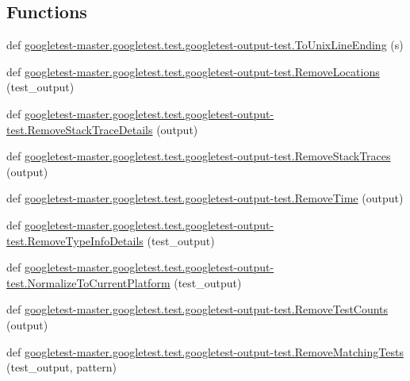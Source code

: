 \subsection*{Functions}
\begin{DoxyCompactItemize}
\item 
def \mbox{\hyperlink{namespacegoogletest-master_1_1googletest_1_1test_1_1googletest-output-test_a99ee2f28903ba3d04da61284954555ba}{googletest-\/master.\+googletest.\+test.\+googletest-\/output-\/test.\+To\+Unix\+Line\+Ending}} (s)
\item 
def \mbox{\hyperlink{namespacegoogletest-master_1_1googletest_1_1test_1_1googletest-output-test_ae2093a22c4f977ed13069650e4534fff}{googletest-\/master.\+googletest.\+test.\+googletest-\/output-\/test.\+Remove\+Locations}} (test\+\_\+output)
\item 
def \mbox{\hyperlink{namespacegoogletest-master_1_1googletest_1_1test_1_1googletest-output-test_aee873d176cddc7bb2559b50887419433}{googletest-\/master.\+googletest.\+test.\+googletest-\/output-\/test.\+Remove\+Stack\+Trace\+Details}} (output)
\item 
def \mbox{\hyperlink{namespacegoogletest-master_1_1googletest_1_1test_1_1googletest-output-test_ae1a87e3ccd04cfdf3363c25222f8bc3f}{googletest-\/master.\+googletest.\+test.\+googletest-\/output-\/test.\+Remove\+Stack\+Traces}} (output)
\item 
def \mbox{\hyperlink{namespacegoogletest-master_1_1googletest_1_1test_1_1googletest-output-test_a75890b23e25ee3a8771b216c33346e8b}{googletest-\/master.\+googletest.\+test.\+googletest-\/output-\/test.\+Remove\+Time}} (output)
\item 
def \mbox{\hyperlink{namespacegoogletest-master_1_1googletest_1_1test_1_1googletest-output-test_a67f6bfc71ed1130bb733ac13911f772a}{googletest-\/master.\+googletest.\+test.\+googletest-\/output-\/test.\+Remove\+Type\+Info\+Details}} (test\+\_\+output)
\item 
def \mbox{\hyperlink{namespacegoogletest-master_1_1googletest_1_1test_1_1googletest-output-test_abca7185452020485c9396b5ff4363d70}{googletest-\/master.\+googletest.\+test.\+googletest-\/output-\/test.\+Normalize\+To\+Current\+Platform}} (test\+\_\+output)
\item 
def \mbox{\hyperlink{namespacegoogletest-master_1_1googletest_1_1test_1_1googletest-output-test_a1ed6e9dc7176e5072f1be1ed780431a5}{googletest-\/master.\+googletest.\+test.\+googletest-\/output-\/test.\+Remove\+Test\+Counts}} (output)
\item 
def \mbox{\hyperlink{namespacegoogletest-master_1_1googletest_1_1test_1_1googletest-output-test_a8c537e52507a48e97fa37401b568adba}{googletest-\/master.\+googletest.\+test.\+googletest-\/output-\/test.\+Remove\+Matching\+Tests}} (test\+\_\+output, pattern)

\end{DoxyCompactItemize}
